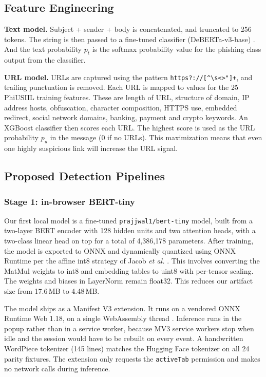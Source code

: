 \documentclass[conference]{IEEEtran}
\begin{document}
\subsection{Feature Engineering}
\textbf{Text model.} Subject + sender + body is concatenated, and truncated to 256 tokens. The string is then passed to a fine-tuned classifier (DeBERTa-v3-base) \cite{he2023debertav3}. And the text probability $p_t$ is the softmax probability value for the phishing class output from the classifier.

\textbf{URL model.} URLs are captured using the pattern \texttt{https?://[\textasciicircum\textbackslash s<>"]+}, and trailing punctuation is removed. Each URL is mapped to values for the 25 PhiUSIIL training features. These are length of URL, structure of domain, IP address hosts, obfuscation, character composition, HTTPS use, embedded redirect, social network domains, banking, payment and crypto keywords. An XGBoost classifier \cite{chen2016xgboost} then scores each URL. The highest score is used as the URL probability $p_u$ in the message (0 if no URLs). This maximization means that even one highly suspicious link will increase the URL signal.

\subsection{Proposed Detection Pipelines}
\subsubsection{Stage 1: in-browser BERT-tiny}
Our first local model is a fine-tuned \texttt{prajjwal1/bert-tiny} \cite{turc2019wellread} model, built from a two-layer BERT \cite{devlin2019bert} encoder with 128 hidden units and two attention heads, with a two-class linear head on top for a total of 4,386,178 parameters. After training, the model is exported to ONNX and dynamically quantized using ONNX Runtime \cite{onnxruntime} per the affine int8 strategy of Jacob \emph{et al.} \cite{jacob2018quantization}. This involves converting the MatMul weights to int8 and embedding tables to uint8 with per-tensor scaling. The weights and biases in LayerNorm remain float32. This reduces our artifact size from 17.6\,MB to 4.48\,MB.

The model ships as a Manifest V3 extension. It runs on a vendored ONNX Runtime Web 1.18, on a single WebAssembly thread \cite{onnxruntime}. Inference runs in the popup rather than in a service worker, because MV3 service workers stop when idle and the session would have to be rebuilt on every event. A handwritten WordPiece tokenizer (145 lines) matches the Hugging Face tokenizer on all 24 parity fixtures. The extension only requests the \texttt{activeTab} permission and makes no network calls during inference.
\end{document}
